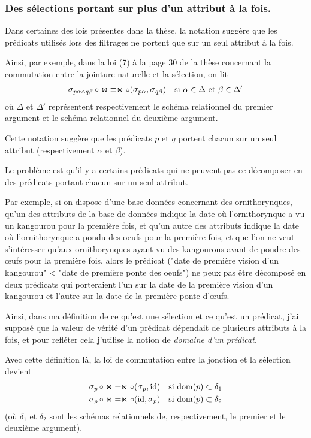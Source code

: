 \subsubsection*{Des sélections portant sur plus d'un attribut à la fois.}
Dans certaines des lois présentes dans la thèse, la notation
suggère que les prédicats utilisés lors des filtrages ne portent que sur
un seul attribut à la fois.

Ainsi, par exemple, dans la loi (7) à la page 30 de la thèse
concernant la commutation entre la jointure naturelle et la
sélection,
on lit
\begin{align*}
\sel_{p\alpha \wedge q\beta} \circ \Join 
& \equiv \Join \circ (\sel_{p\alpha}, \sel_{q\beta})
& \text{si $\alpha \in \Delta$ et $\beta \in \Delta'$}
\end{align*}
où $\Delta$ et $\Delta'$ représentent respectivement le schéma relationnel
du premier argument et le schéma relationnel du deuxième argument.

Cette notation suggère que les prédicats $p$ et $q$ portent
chacun sur un seul attribut (respectivement $\alpha$ et $\beta$).

Le problème est qu'il y a certains prédicats qui ne peuvent
pas ce décomposer en des prédicats portant chacun sur un seul attribut.

Par exemple, si on dispose d'une base données concernant
des ornithorynques, qu'un des attributs de la base de données indique
la date où l'ornithorynque a vu un kangourou pour la première fois,
et qu'un autre des attributs indique la date où l'ornithorynque a pondu des oeufs
pour la première fois,
et que l'on ne veut s'intéresser qu'aux ornithorynques ayant vu des kangourous avant
de pondre des œufs pour la première fois, alors le prédicat
("date de première vision d'un kangourou" < "date de première ponte des oeufs")
ne peux pas être décomposé en deux prédicats qui porteraient l'un sur 
la date de la première vision d'un kangourou et l'autre sur la date de la 
première ponte d'œufs.

Ainsi, dans ma définition de ce qu'est une sélection et ce qu'est un prédicat,
j'ai supposé que la valeur de vérité d'un prédicat dépendait de plusieurs
attributs à la fois, et pour refléter cela j'utilise la notion de
\emph{domaine d'un prédicat}.

Avec cette définition là, la loi de commutation entre la jonction
et la sélection devient
\begin{align*}
\selP \circ \Join
& = \Join \circ (\selP, \id)
& \text{si $\dom(p) \subset \delta_1$}
\label{seljoin1}\\ 
\selP \circ \Join
& = \Join \circ (\id, \selP)
& \text{si $\dom(p) \subset \delta_2$}
\end{align*}
(où $\delta_1$ et $\delta_2$ sont les schémas relationnels de, respectivement,
le premier et le deuxième argument).


